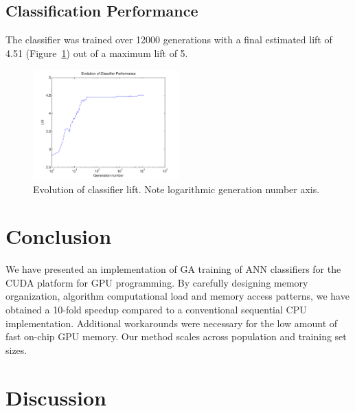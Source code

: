 \documentclass[11pt]{article}       %
\begin{document}
\subsection{Classification Performance} \label{results}
The classifier was trained over 12000 generations with a final estimated lift of 4.51 (Figure~\ref{fig:evolution-lift}) out of a maximum lift of 5.

\begin{figure}[h]
	\centering
	\includegraphics[width=0.5\textwidth]{fig-evolution-lift}
	\caption{Evolution of classifier lift. Note logarithmic generation number axis.}
	\label{fig:evolution-lift}
\end{figure}

\section{Conclusion} \label{concl}
We have presented an implementation of GA training of ANN classifiers for the CUDA platform for GPU programming. By carefully designing memory organization, algorithm computational load and memory access patterns, we have obtained a 10-fold speedup compared to a conventional sequential CPU implementation. Additional workarounds were necessary for the low amount of fast on-chip GPU memory. Our method scales across population and training set sizes.

\section{Discussion} \label{disc}
\end{document}

